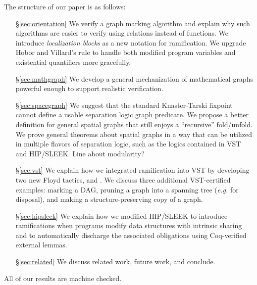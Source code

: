 The structure of our paper is as follows:
\begin{itemize}
\item[\S\ref{sec:orientation}] We verify a graph marking algorithm and explain why such algorithms are easier to verify using relations instead of functions.  We introduce \emph{localization blocks} as a new notation for ramification.  We upgrade Hobor and Villard's  rule to handle both modified program variables and existential quantifiers more gracefully.
\item[\S\ref{sec:mathgraph}] We develop a general mechanization of mathematical graphs powerful enough to support realistic verification. %
\item[\S\ref{sec:spacegraph}] We suggest that the standard Knaster-Tarski fixpoint~\cite{tarski:fixpoint} cannot define a usable separation logic graph predicate.  We propose a better definition for general spatial graphs that still enjoys a ``recursive'' fold/unfold.  We prove general theorems about spatial graphs in a way that can be utilized in multiple flavors of separation logic, such as the logics contained in VST and HIP/SLEEK. {\color{magenta} Line about modularity?}
\item[\S\ref{sec:vst}] We explain how we integrated ramification into VST by developing two new Floyd tactics,  and .  We discuss three additional VST-certified examples: marking a DAG, pruning a graph into a spanning tree (\emph{e.g.} for disposal), and making a structure-preserving copy of a graph.
\item[\S\ref{sec:hipsleek}] We explain how we modified HIP/SLEEK to introduce ramifications when programs modify data structures with intrinsic sharing and to automatically discharge the associated obligations using Coq-verified external lemmas.
\item[\S\ref{sec:related}] We discuss related work, future work, and conclude.
\end{itemize}
All of our results are machine checked.

